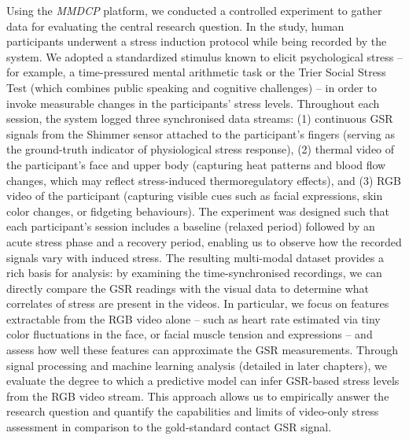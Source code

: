 \documentclass[11pt,a4paper]{report}
\begin{document}
Using the \textit{MMDCP} platform, we conducted a controlled experiment to gather data for evaluating the central research question. In the study, human participants underwent a stress induction protocol while being recorded by the system. We adopted a standardized stimulus known to elicit psychological stress – for example, a time-pressured mental arithmetic task or the Trier Social Stress Test (which combines public speaking and cognitive challenges) – in order to invoke measurable changes in the participants’ stress levels. Throughout each session, the system logged three synchronised data streams: (1) continuous GSR signals from the Shimmer sensor attached to the participant’s fingers (serving as the ground-truth indicator of physiological stress response), (2) thermal video of the participant’s face and upper body (capturing heat patterns and blood flow changes, which may reflect stress-induced thermoregulatory effects), and (3) RGB video of the participant (capturing visible cues such as facial expressions, skin color changes, or fidgeting behaviours). The experiment was designed such that each participant’s session includes a baseline (relaxed period) followed by an acute stress phase and a recovery period, enabling us to observe how the recorded signals vary with induced stress. The resulting multi-modal dataset provides a rich basis for analysis: by examining the time-synchronised recordings, we can directly compare the GSR readings with the visual data to determine what correlates of stress are present in the videos. In particular, we focus on features extractable from the RGB video alone – such as heart rate estimated via tiny color fluctuations in the face, or facial muscle tension and expressions – and assess how well these features can approximate the GSR measurements. Through signal processing and machine learning analysis (detailed in later chapters), we evaluate the degree to which a predictive model can infer GSR-based stress levels from the RGB video stream. This approach allows us to empirically answer the research question and quantify the capabilities and limits of video-only stress assessment in comparison to the gold-standard contact GSR signal.
\end{document}

